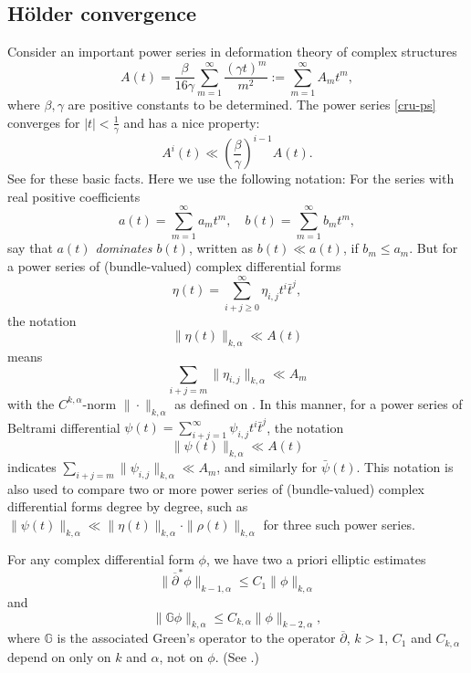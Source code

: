 \documentclass[12pt]{amsart}
\numberwithin{equation}{section}
\renewcommand{\1}{\mathds{1}}
\newcommand{\G}{\mathbb{G}}
\newcommand{\db}{\overline{\partial}}
\renewcommand{\>}{\rightarrow}
\def\b{\bar}
\begin{document}
\subsection{H\"older convergence}\label{convergence}
Consider an important power series in deformation theory of complex
structures
\begin{equation}\label{cru-ps}
A(t)=\frac{\beta}{16\gamma}\sum_{m=1}^\infty\frac{(\gamma
t)^m}{m^2}:=\sum_{m=1}^\infty A_m t^m,
\end{equation}
where $\beta, \gamma$ are positive constants to be determined. The
power series \eqref{cru-ps} converges for $|t|<\frac{1}{\gamma}$ and
has a nice property:
\begin{equation}\label{p-prin}
A^i(t)\ll {\left(\frac{\beta}{\gamma}\right)}^{i-1}A(t).
\end{equation}
 See \cite[Lemma 3.6 and its Corollary in Chapter 2]{MK} for these
basic facts. Here we use the following notation: For the series with
real positive coefficients
$$a(t)=\sum_{m=1}^\infty a_m t^m, \quad b(t)=\sum_{m=1}^\infty b_m t^m,$$
say that \emph{$a(t)$ dominates $b(t)$}, written as $b(t)\ll a(t)$,
if $ b_m\leq a_m$. But for a power series of (bundle-valued) complex differential
forms
$$\eta(t)=\sum_{i+j\geq 0}^\infty \eta_{i,j} t^i\bar{t}^j,$$ the
notation
$$\|\eta(t)\|_{k, \alpha}\ll A(t)$$ means
$$\sum_{i+j=m}\|\eta_{i,j}\|_{k, \alpha}
\ll A_m$$ with the $C^{k, \alpha}$-norm $\|\cdot\|_{k, \alpha}$ as
defined on \cite[Page 159]{MK}. In this manner, for a power
series of Beltrami differential $\psi(t)=\sum_{i+j=1}^\infty \psi_{i,j}
t^i\b t^j$, the notation
$$\|\psi(t)\|_{k, \alpha}\ll A(t)$$ indicates
$\sum_{i+j=m}\|\psi_{i,j}\|_{k, \alpha}
\ll A_m$, and similarly for $\bar{\psi}(t)$. This notation is also used to compare two or more power
series of (bundle-valued) complex differential forms degree by degree, such as $\|\psi(t)\|_{k, \alpha}\ll \|\eta(t)\|_{k, \alpha}\cdot\|\rho(t)\|_{k, \alpha}$ for three such power series.


For any complex differential form $\phi$, we have two a priori
elliptic estimates
\begin{equation}\label{ee1}
\|\overline{\partial}^*\phi\|_{k-1, \alpha}\leq C_1\|\phi\|_{k,
\alpha}
\end{equation}
and
\begin{equation}\label{db-ee2}
\|\G\phi\|_{k, \alpha}\leq C_{k,\alpha}\|\phi\|_{k-2, \alpha},
\end{equation}
where $\G$ is the associated Green's operator to the operator $\db$, $k>1$, $C_1$ and $C_{k,\alpha}$
depend on only on $k$ and $\alpha$, not on $\phi$. (See \cite[Proposition
$2.3$ in Chapter $4$]{MK}.)
\end{document}
